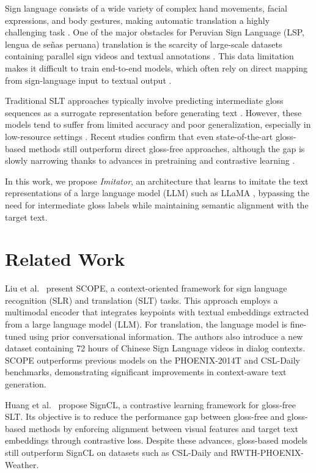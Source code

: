 \documentclass[runningheads]{llncs}
\begin{document}
Sign language consists of a wide variety of complex hand movements, facial expressions, and body gestures, making automatic translation a highly challenging task \cite{li2023adtrvlp}. One of the major obstacles for Peruvian Sign Language (LSP, lengua de señas peruana) translation is the scarcity of large-scale datasets containing parallel sign videos and textual annotations \cite{ojyyys_2022}. This data limitation makes it difficult to train end-to-end models, which often rely on direct mapping from sign-language input to textual output \cite{ronchetti2023lsa}.

Traditional SLT approaches typically involve predicting intermediate gloss sequences as a surrogate representation before generating text \cite{liu2024scopesignlanguagecontextual}. However, these models tend to suffer from limited accuracy and poor generalization, especially in low-resource settings \cite{li2023adtrvlp}. Recent studies confirm that even state-of-the-art gloss-based methods still outperform direct gloss-free approaches, although the gap is slowly narrowing thanks to advances in pretraining and contrastive learning \cite{zhao2024llavaSLT, li2023adtrvlp}.

In this work, we propose \textit{Imitator}, an architecture that learns to imitate the text representations of a large language model (LLM) such as LLaMA \cite{jaegle2021perceiver}, bypassing the need for intermediate gloss labels while maintaining semantic alignment with the target text.

\section{Related Work}

Liu et al.~\cite{liu2024scopesignlanguagecontextual} present SCOPE, a context-oriented framework for sign language recognition (SLR) and translation (SLT) tasks. This approach employs a multimodal encoder that integrates keypoints with textual embeddings extracted from a large language model (LLM). For translation, the language model is fine-tuned using prior conversational information. The authors also introduce a new dataset containing 72 hours of Chinese Sign Language videos in dialog contexts. SCOPE outperforms previous models on the PHOENIX-2014T and CSL-Daily benchmarks, demonstrating significant improvements in context-aware text generation.

Huang et al.~\cite{liu2024scopesignlanguagecontextual} propose SignCL, a contrastive learning framework for gloss-free SLT. Its objective is to reduce the performance gap between gloss-free and gloss-based methods by enforcing alignment between visual features and target text embeddings through contrastive loss. Despite these advances, gloss-based models still outperform SignCL on datasets such as CSL-Daily and RWTH-PHOENIX-Weather.
\end{document}
